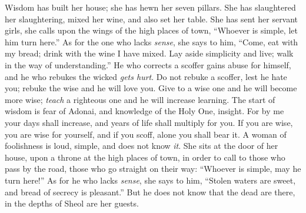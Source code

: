 \begin{biblechapter} %
 Wisdom has built her house; 
she has hewn her seven pillars.
\verse She has slaughtered her slaughtering, mixed her wine, 
and also set her table.
\verse She has sent her servant girls, she calls 
upon the wings of the high places of town,
\verse “Whoever is simple, let him turn here.” 
As for the one who lacks \textit{sense}, she says to him,
\verse “Come, eat with my bread; 
drink with the wine I have mixed.
\verse Lay aside simplicity and live; 
walk in the way of understanding.”
\verse He who corrects a scoffer gains abuse for himself, 
and he who rebukes the wicked \textit{gets hurt}.
\verse Do not rebuke a scoffer, lest he hate you; 
rebuke the wise and he will love you.
\verse Give to a wise one and he will become more wise; 
\textit{teach} a righteous one and he will increase learning.
 The start of wisdom is fear of Adonai, 
and knowledge of the Holy One, insight.
\verse For by me your days shall increase, 
and years of life shall multiply for you.
\verse If you are wise, you are wise for yourself, 
and if you scoff, alone you shall bear it.
\verse A woman of foolishness is loud, 
simple, and does not know \textit{it}.
\verse She sits at the door of her house, 
upon a throne at the high places of town,
\verse in order to call to those who pass by the road, 
those who go straight on their way:
\verse “Whoever is simple, may he turn here!” 
As for he who lacks \textit{sense}, she says to him,
\verse “Stolen waters are sweet, 
and bread of secrecy is pleasant.”
\verse But he does not know that the dead are there, 
in the depths of Sheol are her guests.
\end{biblechapter}

